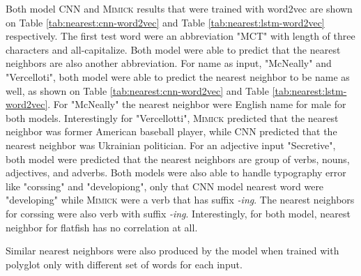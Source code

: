         Both model CNN and \textsc{Mimick} results that were trained
        with word2vec are shown on Table
        \ref{tab:nearest:cnn-word2vec} and Table
        \ref{tab:nearest:lstm-word2vec} respectively. The first test
        word were an abbreviation "MCT" with length of three
        characters and all-capitalize. Both model were able to predict
        that the nearest neighbors are also another abbreviation. For
        name as input, "McNeally" and "Vercelloti", both model were
        able to predict the nearest neighbor to be name as well, as
        shown on Table \ref{tab:nearest:cnn-word2vec} and Table
        \ref{tab:nearest:lstm-word2vec}. For "McNeally" the nearest
        neighbor were English name for male for both models.
        Interestingly for "Vercellotti", \textsc{Mimick} predicted
        that the nearest neighbor was former American baseball player,
        while CNN predicted that the nearest neighbor was Ukrainian
        politician. For an adjective input "Secretive", both model
        were predicted that the nearest neighbors are group of verbs,
        nouns, adjectives, and adverbs. Both models were also able to
        handle typography error like "corssing" and "developiong",
        only that CNN model nearest word were "developing" while
        \textsc{Mimick} were a verb that has suffix \textit{-ing}. The
        nearest neighbors for corssing were also verb with suffix
        \textit{-ing}. Interestingly, for both model, nearest neighbor
        for flatfish has no correlation at all.

        Similar nearest neighbors were also produced by the model when
        trained with polyglot \citep{polyglot2013alrfou} only with
        different set of words for each input.

